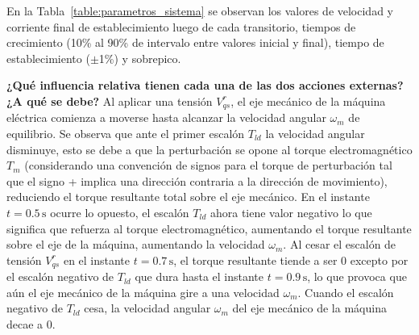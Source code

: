 \documentclass{article}
\begin{document}
En la Tabla~\ref{table:parametros_sistema} se observan los valores de velocidad y corriente final de establecimiento luego de cada transitorio, tiempos de crecimiento (10\% al 90\% de intervalo entre valores inicial y final), tiempo de establecimiento ($\pm$1\%) y sobrepico. 

\textbf{¿Qué influencia relativa tienen cada una de las dos acciones externas? ¿A qué se debe?} Al aplicar una tensión \(V^r_{qs}\), el eje mecánico de la máquina eléctrica comienza a moverse hasta alcanzar la velocidad angular $\omega_m$ de equilibrio. Se observa que ante el primer escalón \(T_{ld}\) la velocidad angular disminuye, esto se debe a que la perturbación se opone al torque electromagnético \(T_m\) (considerando una convención de signos para el torque de perturbación tal que el signo + implica una dirección contraria a la dirección de movimiento), reduciendo el torque resultante total sobre el eje mecánico. En el instante $t = 0.5\, \text{s}$ ocurre lo opuesto, el escalón \(T_{ld}\) ahora tiene valor negativo lo que significa que refuerza al torque electromagnético, aumentando el torque resultante sobre el eje de la máquina, aumentando la velocidad $\omega_m$. Al cesar el escalón de tensión \(V^r_{qs}\) en el instante $t = 0.7\, \text{s}$, el torque resultante tiende a ser 0 excepto por el escalón negativo de \(T_{ld}\) que dura hasta el instante $t = 0.9\, \text{s}$, lo que provoca que aún el eje mecánico de la máquina gire a una velocidad $\omega_m$. Cuando el escalón negativo de \(T_{ld}\) cesa, la velocidad angular $\omega_m$ del eje mecánico de la máquina decae a 0.
\end{document}
